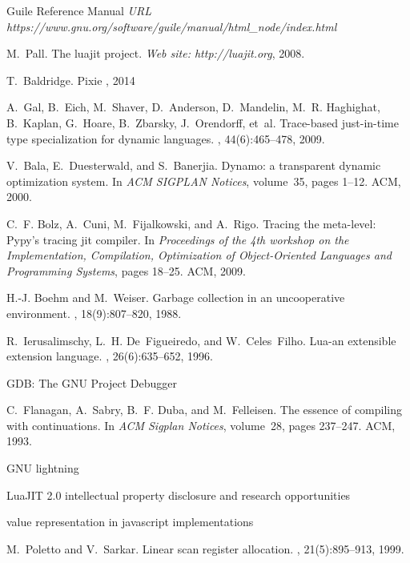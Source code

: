 \documentclass[preprint, numbers]{sigplanconf}
\begin{document}
\begin{thebibliography}{}
 Guile Reference Manual \newblock
  {\em URL https://www.gnu.org/software/guile/manual/html\_node/index.html}

 M.~Pall.  \newblock The luajit project.  \newblock
  {\em Web site: http://luajit.org}, 2008.

 T.~Baldridge.  \newblock Pixie , 2014

A.~Gal, B.~Eich, M.~Shaver, D.~Anderson, D.~Mandelin, M.~R. Haghighat,
  B.~Kaplan, G.~Hoare, B.~Zbarsky, J.~Orendorff, et~al.
\newblock Trace-based just-in-time type specialization for dynamic languages.
, 44(6):465--478, 2009.

V.~Bala, E.~Duesterwald, and S.~Banerjia.
\newblock Dynamo: a transparent dynamic optimization system.
\newblock In {\em ACM SIGPLAN Notices}, volume~35, pages 1--12. ACM, 2000.

C.~F. Bolz, A.~Cuni, M.~Fijalkowski, and A.~Rigo.
\newblock Tracing the meta-level: Pypy's tracing jit compiler.
\newblock In {\em Proceedings of the 4th workshop on the Implementation,
  Compilation, Optimization of Object-Oriented Languages and Programming
  Systems}, pages 18--25. ACM, 2009.

H.-J. Boehm and M.~Weiser.
\newblock Garbage collection in an uncooperative environment.
, 18(9):807--820, 1988.

R.~Ierusalimschy, L.~H. De~Figueiredo, and W.~Celes~Filho.
\newblock Lua-an extensible extension language.
, 26(6):635--652, 1996.

  \newblock GDB: The GNU Project Debugger

C.~Flanagan, A.~Sabry, B.~F. Duba, and M.~Felleisen.
\newblock The essence of compiling with continuations.
\newblock In {\em ACM Sigplan Notices}, volume~28, pages 237--247. ACM, 1993.

  \newblock GNU lightning

  \newblock LuaJIT 2.0 intellectual property disclosure and research
  opportunities

  \newblock value representation in javascript implementations

M.~Poletto and V.~Sarkar.
\newblock Linear scan register allocation.
,
  21(5):895--913, 1999.

\end{thebibliography}
\end{document}

